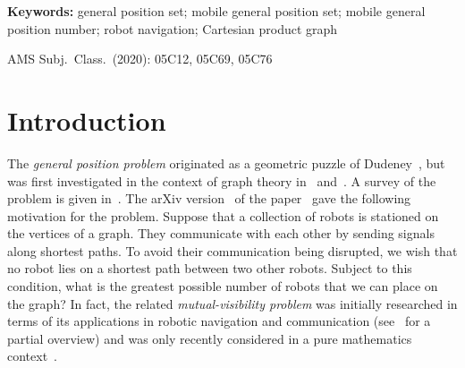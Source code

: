 \documentclass[a4paper,12pt]{article}
\theoremstyle{definition}
\begin{document}
	\begin{abstract}
		The general position problem asks for large sets of vertices such that no three vertices of the set lie on a common shortest path. Recently a dynamic version of this problem was defined, called the \emph{mobile general position problem}, in which a collection of robots must visit all the vertices of the graph whilst remaining in general position. In this paper we investigate this problem in the context of Cartesian products, corona products and joins, giving upper and lower bounds for general graphs and exact values for families including grids, cylinders, Hamming graphs and prisms of trees.
	\end{abstract}
	
	\noindent
	{\bf Keywords:} general position set; mobile general position set; mobile general position number; robot navigation; Cartesian product graph
	
	\noindent
	AMS Subj.\ Class.\ (2020): 05C12, 05C69, 05C76
	
	\section{Introduction}\label{sec:intro}
	
	The \emph{general position problem} originated as a geometric puzzle of Dudeney~\cite{dudeney-1917}, but was first investigated in the context of graph theory in~\cite{ullas-2016} and~\cite{manuel-2018}. A survey of the problem is given in~\cite{survey}. The arXiv version~\cite{manuel-2017arxiv} of the paper~\cite{manuel-2018} gave the following motivation for the problem. Suppose that a collection of robots is stationed on the vertices of a graph. They communicate with each other by sending signals along shortest paths. To avoid their communication being disrupted, we wish that no robot lies on a shortest path between two other robots. Subject to this condition, what is the greatest possible number of robots that we can place on the graph? In fact, the related \emph{mutual-visibility problem} was initially researched in terms of its applications in robotic navigation and communication (see~\cite{aljohani-2018a,aljohani-2018b,diluna-2017} for a partial overview) and was only recently considered in a pure mathematics context~\cite{DiStef}.
	
\end{document}

